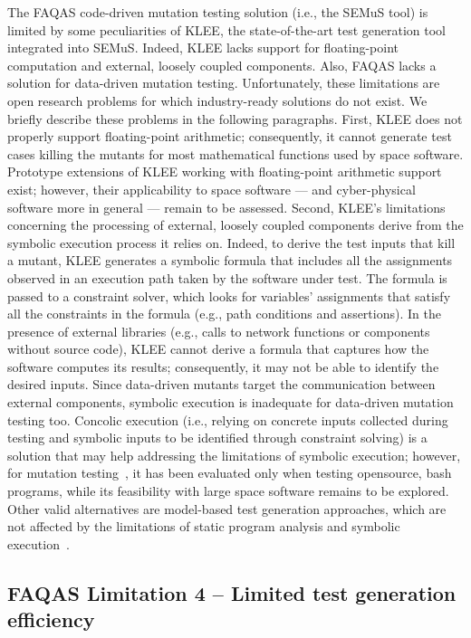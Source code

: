The FAQAS code-driven mutation testing solution (i.e., the SEMuS tool) is limited by some peculiarities of KLEE, the state-of-the-art test generation tool integrated into SEMuS. Indeed, KLEE lacks support for floating-point computation and external, loosely coupled components. Also, FAQAS lacks a solution for data-driven mutation testing. Unfortunately, these limitations are open research problems for which industry-ready solutions do not exist. We briefly describe these problems in the following paragraphs. First, KLEE does not properly support floating-point arithmetic; consequently, it cannot generate test cases killing the mutants for most mathematical functions used by space software. Prototype extensions of KLEE working with floating-point arithmetic support exist; however, their applicability to space software — and cyber-physical software more in general — remain to be assessed. Second, KLEE’s limitations concerning the processing of external, loosely coupled components derive from the symbolic execution process it relies on. Indeed, to derive the test inputs that kill a mutant, KLEE generates a symbolic formula that includes all the assignments observed in an execution path taken by the software under test. The formula is passed to a constraint solver, which looks for variables’ assignments that satisfy all the constraints in the formula (e.g., path conditions and assertions). In the presence of external libraries (e.g., calls to network functions or components without source code), KLEE cannot derive a formula that captures how the software computes its results; consequently, it may not be able to identify the desired inputs. Since data-driven mutants target the communication between external components, symbolic execution is inadequate for data-driven mutation testing too. Concolic execution (i.e., relying on concrete inputs collected during testing and symbolic inputs to be identified through constraint solving) is a solution that may help addressing the limitations of symbolic execution; however, for mutation testing~\cite{chekam2021killing}, it has been evaluated only when testing opensource, bash programs, while its feasibility with large space software remains to be explored. Other valid alternatives are model-based test generation approaches, which are not affected by the limitations of static program analysis and symbolic execution~\cite{di2017augmenting}.

\subsection{FAQAS Limitation 4 – Limited test generation efficiency}

